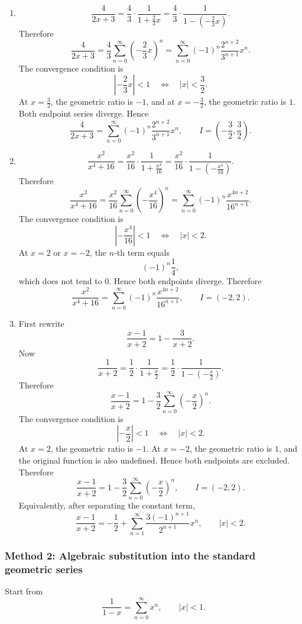 \documentclass[12pt]{article}
\begin{document}
\begin{enumerate}[label=(\alph*)]
\item
\[
\frac4{2x+3}
=
\frac43\cdot\frac1{1+\frac23x}
=
\frac43\cdot\frac1{1-\left(-\frac23x\right)}.
\]
Therefore
\[
\frac4{2x+3}
=
\frac43\sum_{n=0}^{\infty}\left(-\frac23x\right)^n
=
\sum_{n=0}^{\infty}(-1)^n\frac{2^{n+2}}{3^{n+1}}x^n.
\]
The convergence condition is
\[
\left|-\frac23x\right|<1
\quad\Longleftrightarrow\quad
|x|<\frac32.
\]
At \(x=\frac32\), the geometric ratio is \(-1\), and at \(x=-\frac32\), the geometric ratio is \(1\). Both endpoint series diverge. Hence
\[
\boxed{
\frac4{2x+3}
=
\sum_{n=0}^{\infty}(-1)^n\frac{2^{n+2}}{3^{n+1}}x^n,
\qquad
I=\left(-\frac32,\frac32\right).
}
\]

\item
\[
\frac{x^2}{x^4+16}
=
\frac{x^2}{16}\cdot\frac1{1+\frac{x^4}{16}}
=
\frac{x^2}{16}\cdot\frac1{1-\left(-\frac{x^4}{16}\right)}.
\]
Therefore
\[
\frac{x^2}{x^4+16}
=
\frac{x^2}{16}\sum_{n=0}^{\infty}\left(-\frac{x^4}{16}\right)^n
=
\sum_{n=0}^{\infty}(-1)^n\frac{x^{4n+2}}{16^{n+1}}.
\]
The convergence condition is
\[
\left|-\frac{x^4}{16}\right|<1
\quad\Longleftrightarrow\quad
|x|<2.
\]
At \(x=2\) or \(x=-2\), the \(n\)-th term equals
\[
(-1)^n\frac14,
\]
which does not tend to \(0\). Hence both endpoints diverge. Therefore
\[
\boxed{
\frac{x^2}{x^4+16}
=
\sum_{n=0}^{\infty}(-1)^n\frac{x^{4n+2}}{16^{n+1}},
\qquad
I=(-2,2).
}
\]

\item First rewrite
\[
\frac{x-1}{x+2}
=
1-\frac3{x+2}.
\]
Now
\[
\frac1{x+2}
=
\frac12\cdot\frac1{1+\frac x2}
=
\frac12\cdot\frac1{1-\left(-\frac x2\right)}.
\]
Therefore
\[
\frac{x-1}{x+2}
=
1-\frac32\sum_{n=0}^{\infty}\left(-\frac x2\right)^n.
\]
The convergence condition is
\[
\left|-\frac x2\right|<1
\quad\Longleftrightarrow\quad
|x|<2.
\]
At \(x=2\), the geometric ratio is \(-1\). At \(x=-2\), the geometric ratio is \(1\), and the original function is also undefined. Hence both endpoints are excluded. Therefore
\[
\boxed{
\frac{x-1}{x+2}
=
1-\frac32\sum_{n=0}^{\infty}\left(-\frac x2\right)^n,
\qquad
I=(-2,2).
}
\]
Equivalently, after separating the constant term,
\[
\frac{x-1}{x+2}
=
-\frac12+\sum_{n=1}^{\infty}\frac{3(-1)^{n+1}}{2^{n+1}}x^n,
\qquad |x|<2.
\]
\end{enumerate}

\newpage
\subsubsection*{Method 2: Algebraic substitution into the standard geometric series}
Start from
\[
\frac1{1-x}=\sum_{n=0}^{\infty}x^n,
\qquad |x|<1.
\]
\end{document}
